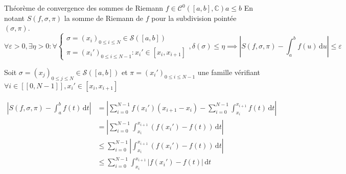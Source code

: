 \documentclass{article}
\begin{document}
\begin{question_kholle}{Théorème de convergence des sommes de Riemann}
	$f \in \mathcal{C}^{0}([a, b], \mathbb{C}) a\leqslant b$ 
	En notant $S(f, \sigma, \pi)$ la somme de Riemann de $f$ pour la subdivision pointée $(\sigma, \pi)$.
$$
	\forall \varepsilon >0, \exists \eta >0: \forall \left\{ \begin{array}{ll}
		\sigma = (x_{i})_{0 \leqslant i \leqslant N} \in \mathcal{S}([a, b])  \\
		\pi = (x_{i}')_{0\leqslant i\leqslant N-1} : x_{i}' \in [x_{i}, x_{i+1 }]
	\end{array}\right. , \delta(\sigma) \leqslant \eta \implies \left\lvert  S(f, \sigma, \pi) - \int_{a}^{b} f(u) \, \mathrm du   \right\rvert \leqslant \varepsilon
$$
	
	Soit $\sigma = (x_{j})_{0\leqslant j \leqslant N} \in \mathcal{S}([a, b])$ et $\pi = (x_{i}')_{0 \leqslant i \leqslant N - 1}$ une famille vérifiant $\forall i \in [ \! [ 0, N-1 ] \!], x_{i}' \in [x_{i}, x_{i+1}]$
	
	
	\begin{align*}
		\left\lvert  S(f, \sigma, \pi) - \int_{a}^{b} f(t) \, \mathrm dt   \right\rvert &= \left\lvert  \sum_{i=0}^{N-1}f(x_{i}')(x_{i+1}-x_{i}) - \sum_{i=0}^{N - 1}\int_{x_{i}}^{x_{i+1}} f(t) \, \mathrm dt   \right\rvert  \\
		&= \left\lvert  \sum_{i=0}^{N-1}\int_{x_{i}}^{x_{i+1}} (f(x_{i}')-f(t)) \, \mathrm dt   \right\rvert  \\
		&\leqslant \sum_{i=0}^{N-1}\left\lvert  \int_{x_{i}}^{x_{i+1}} (f(x_{i}')-f(t)) \, \mathrm dt   \right\rvert  \\
		&\leqslant \sum_{i=0}^{N-1}\int_{x_{i}}^{x_{i+1}} \lvert f(x_{i}') - f(t) \rvert \, \mathrm dt
	\end{align*}
	

\end{question_kholle}
\end{document}
